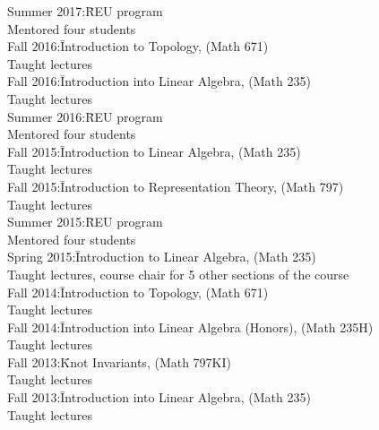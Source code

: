 \documentclass[11pt]{amsart}
\theoremstyle{plain}
\theoremstyle{definition}
\theoremstyle{remark}
\begin{document}
\begin{tabbing}
Summer 2017:\quad\= REU program\\
\>Mentored four students \\



  
Fall 2016:\quad\quad\quad\= Introduction to Topology, (Math 671)\\
\>Taught lectures \\


Fall 2016:\quad\quad\quad\= Introduction into Linear Algebra, (Math 235)\\
\>Taught lectures \\

Summer 2016:\quad\= REU program\\
\>Mentored four students \\

Fall 2015:\quad\quad\quad\= Introduction to Linear Algebra, (Math 235)\\
\>Taught lectures \\


Fall 2015:\quad\quad\quad\= Introduction to Representation Theory, (Math 797)\\
\>Taught lectures \\

Summer 2015:\quad\= REU program\\
\>Mentored four students \\

Spring 2015:\quad\quad\= Introduction to Linear Algebra, (Math 235)\\
\>Taught lectures, course chair for 5 other sections of the course\\


Fall 2014:\quad\quad\quad\= Introduction to Topology, (Math 671)\\
\>Taught lectures \\


Fall 2014:\quad\quad\quad\= Introduction into Linear Algebra (Honors), (Math 235H)\\
\>Taught lectures \\



Fall 2013:\quad\quad\quad\= Knot Invariants, (Math 797KI)\\
\>Taught lectures \\


Fall 2013:\quad\quad\quad\= Introduction into Linear Algebra, (Math 235)\\
\>Taught lectures \\



\end{tabbing}
\end{document}
